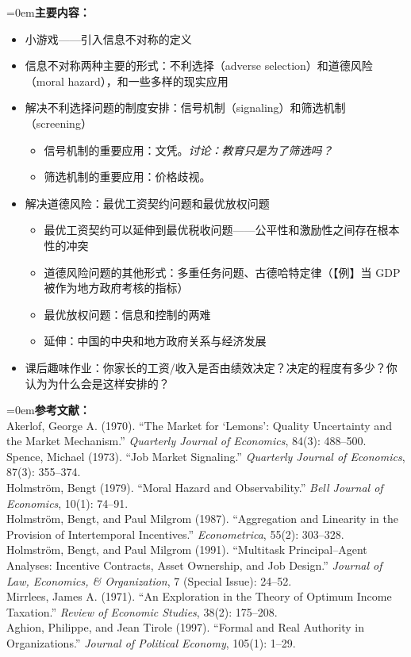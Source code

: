\documentclass[10pt,a4paper]{ctexart}
\newcommand{\field}[1]{\par\noindent\hangindent=0em\textbf{#1}\hspace{0.2em}}
\begin{document}
\field{主要内容：}
\begin{itemize}
  \item 小游戏——引入信息不对称的定义
  \item 信息不对称两种主要的形式：不利选择（adverse selection）和道德风险（moral hazard），和一些多样的现实应用
  \item 解决不利选择问题的制度安排：信号机制（signaling）和筛选机制（screening）
  \begin{itemize}
    \item 信号机制的重要应用：文凭。\textit{讨论：教育只是为了筛选吗？}
    \item 筛选机制的重要应用：价格歧视。
  \end{itemize}
  \item 解决道德风险：最优工资契约问题和最优放权问题
  \begin{itemize}
    \item 最优工资契约可以延伸到最优税收问题——公平性和激励性之间存在根本性的冲突
    \item 道德风险问题的其他形式：多重任务问题、古德哈特定律（【例】当 GDP 被作为地方政府考核的指标）
    \item 最优放权问题：信息和控制的两难
    \item 延伸：中国的中央和地方政府关系与经济发展
  \end{itemize}
  \item 课后趣味作业：你家长的工资/收入是否由绩效决定？决定的程度有多少？你认为为什么会是这样安排的？
\end{itemize}

\field{参考文献：}\\
Akerlof, George A. (1970). ``The Market for `Lemons': Quality Uncertainty and the Market Mechanism.'' \textit{Quarterly Journal of Economics}, 84(3): 488--500.\\
Spence, Michael (1973). ``Job Market Signaling.'' \textit{Quarterly Journal of Economics}, 87(3): 355--374.\\
Holmström, Bengt (1979). ``Moral Hazard and Observability.'' \textit{Bell Journal of Economics}, 10(1): 74--91.\\
Holmström, Bengt, and Paul Milgrom (1987). ``Aggregation and Linearity in the Provision of Intertemporal Incentives.'' \textit{Econometrica}, 55(2): 303--328.\\
Holmström, Bengt, and Paul Milgrom (1991). ``Multitask Principal--Agent Analyses: Incentive Contracts, Asset Ownership, and Job Design.'' \textit{Journal of Law, Economics, \& Organization}, 7 (Special Issue): 24--52.\\
Mirrlees, James A. (1971). ``An Exploration in the Theory of Optimum Income Taxation.'' \textit{Review of Economic Studies}, 38(2): 175--208.\\
Aghion, Philippe, and Jean Tirole (1997). ``Formal and Real Authority in Organizations.'' \textit{Journal of Political Economy}, 105(1): 1--29.
\end{document}
